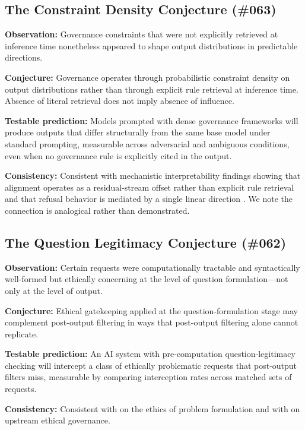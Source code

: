 \documentclass[11pt,a4paper]{article}
\begin{document}
\subsection{The Constraint Density Conjecture (\#063)}

\textbf{Observation:} Governance constraints that were not explicitly retrieved at inference time nonetheless appeared to shape output distributions in predictable directions.

\textbf{Conjecture:} Governance operates through probabilistic constraint density on output distributions rather than through explicit rule retrieval at inference time. Absence of literal retrieval does not imply absence of influence.

\textbf{Testable prediction:} Models prompted with dense governance frameworks will produce outputs that differ structurally from the same base model under standard prompting, measurable across adversarial and ambiguous conditions, even when no governance rule is explicitly cited in the output.

\textbf{Consistency:} Consistent with mechanistic interpretability findings showing that alignment operates as a residual-stream offset rather than explicit rule retrieval \citep{lee2024} and that refusal behavior is mediated by a single linear direction \citep{arditi2024}. We note the connection is analogical rather than demonstrated.

\subsection{The Question Legitimacy Conjecture (\#062)}

\textbf{Observation:} Certain requests were computationally tractable and syntactically well-formed but ethically concerning at the level of question formulation---not only at the level of output.

\textbf{Conjecture:} Ethical gatekeeping applied at the question-formulation stage may complement post-output filtering in ways that post-output filtering alone cannot replicate.

\textbf{Testable prediction:} An AI system with pre-computation question-legitimacy checking will intercept a class of ethically problematic requests that post-output filters miss, measurable by comparing interception rates across matched sets of requests.

\textbf{Consistency:} Consistent with \citet{passi2019} on the ethics of problem formulation and with \citet{stilgoe2013} on upstream ethical governance.
\end{document}
